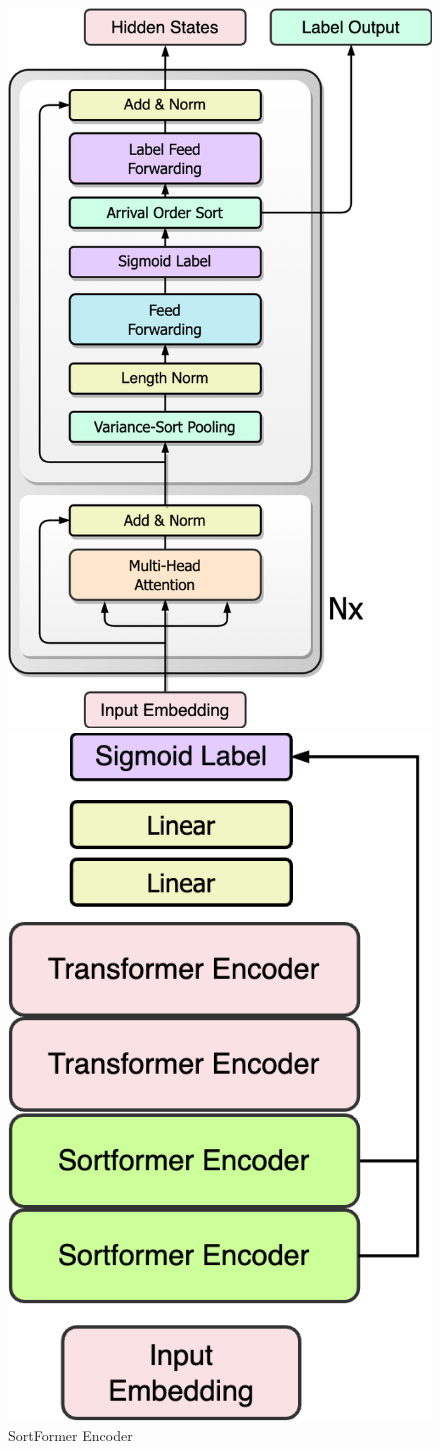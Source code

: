 \documentclass{article}
\begin{document}
\begin{figure}[ht]
\begin{minipage}[b]{0.33\textwidth}
    \includegraphics[width=0.9\linewidth]{pics/SortFormerEncoder.png}
    \caption{SortFormer Encoder}
    \label{fig:subim2}
  \end{minipage}
  \begin{minipage}[b]{0.33\textwidth}
    \centering
    \includegraphics[width=0.5\linewidth]{pics/SortFormer_new-Page-4.drawio.png}

\end{minipage}
\end{figure}
\end{document}
